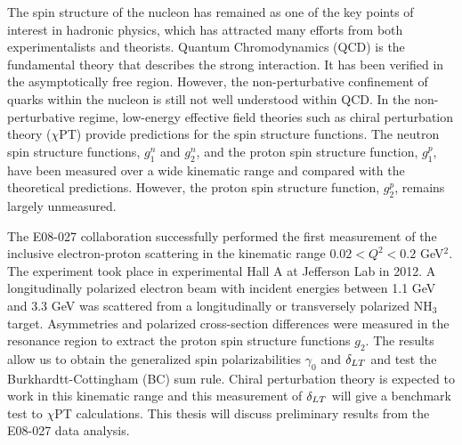 %
%


\noindent

The spin structure of the nucleon has remained as one of the key points of interest in hadronic physics, which has attracted many efforts from both experimentalists and theorists. Quantum Chromodynamics (QCD) is the fundamental theory that describes the strong interaction. It has been verified in the asymptotically free region. However, the non-perturbative confinement of quarks within the nucleon is still not well understood within QCD. In the non-perturbative regime, low-energy effective field theories such as chiral perturbation theory ($\chi$PT) provide predictions for the spin structure functions. The neutron spin structure functions, $g_1^n$ and $g_2^n$, and the proton spin structure function, $g_1^p$, have been measured over a wide kinematic range and compared with the theoretical predictions. However, the proton spin structure function, $g_2^p$, remains largely unmeasured.

The E08-027 collaboration successfully performed the first measurement of the inclusive electron-proton scattering in the kinematic range $0.02<Q^2<0.2$ GeV${}^2$. The experiment took place in experimental Hall A at Jefferson Lab in 2012. A longitudinally polarized electron beam with incident energies between 1.1 GeV and 3.3 GeV was scattered from a longitudinally or transversely polarized NH${}_3$ target. Asymmetries and polarized cross-section differences were measured in the resonance region to extract the proton spin structure functions $g_2$. The results allow us to obtain the generalized spin polarizabilities $\gamma_0$ and $\delta_{LT}$ and test the Burkhardtt-Cottingham (BC) sum rule. Chiral perturbation theory is expected to work in this kinematic range and this measurement of $\delta_{LT}$ will give a benchmark test to $\chi$PT calculations. This thesis will discuss preliminary results from the E08-027 data analysis.

